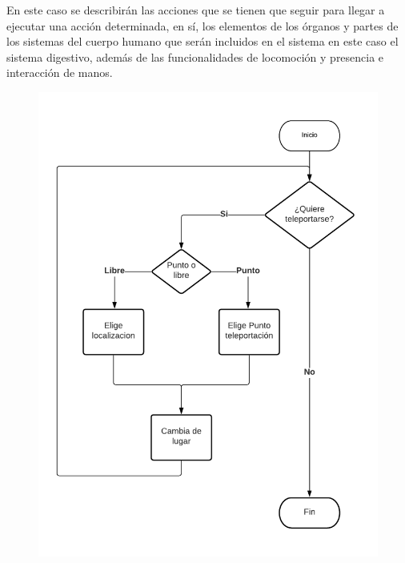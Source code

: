 En este caso se describirán las acciones que se tienen que seguir para llegar a ejecutar una acción determinada, en sí, los elementos de los órganos y partes de los sistemas del cuerpo humano que serán incluidos en el sistema en este caso el sistema digestivo, además de las funcionalidades de locomoción y presencia e interacción de manos.\\
\begin{figure}[H]
	\begin{center}
 		\includegraphics[width = .6\textwidth]{source/images/image1.png}
	\end{center} 
\end{figure}
